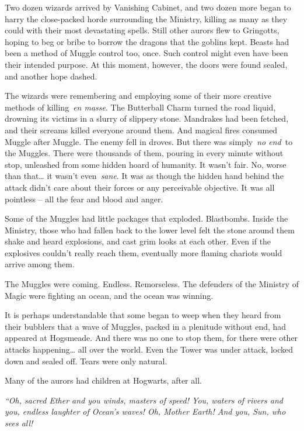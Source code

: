 Two dozen wizards arrived by Vanishing Cabinet, and two dozen more began
to harry the close-packed horde surrounding the Ministry, killing as
many as they could with their most devastating spells. Still other
aurors flew to Gringotts, hoping to beg or bribe to borrow the dragons
that the goblins kept. Beasts had been a method of Muggle control too,
once. Such control might even have been their intended purpose. At this
moment, however, the doors were found sealed, and another hope dashed.

The wizards were remembering and employing some of their more creative
methods of killing~\emph{en masse}. The Butterball Charm turned the road
liquid, drowning its victims in a slurry of slippery stone. Mandrakes
had been fetched, and their screams killed everyone around them. And
magical fires consumed Muggle after Muggle. The enemy fell in droves.
But there was simply~\emph{no end}~to the Muggles. There were thousands
of them, pouring in every minute without stop, unleashed from some
hidden hoard of humanity. It wasn't fair. No, worse than that\ldots{} it
wasn't even~\emph{sane}. It was as though the hidden hand behind the
attack didn't care about their forces or any perceivable objective. It
was all pointless -- all the fear and blood and anger.

Some of the Muggles had little packages that exploded. Blastbombs.
Inside the Ministry, those who had fallen back to the lower level felt
the stone around them shake and heard explosions, and cast grim looks at
each other. Even if the explosives couldn't really reach them,
eventually more flaming chariots would arrive among them.

The Muggles were coming. Endless. Remorseless. The defenders of the
Ministry of Magic were fighting an ocean, and the ocean was winning.

It is perhaps understandable that some began to weep when they heard
from their bubblers that a wave of Muggles, packed in a plenitude
without end, had appeared at Hogsmeade. And there was no one to stop
them, for there were other attacks happening\ldots{} all over the world.
Even the Tower was under attack, locked down and sealed off. Tears were
only natural.

Many of the aurors had children at Hogwarts, after all.

\mybreak

\emph{``Oh, sacred Ether and you winds, masters of speed! You, waters of
rivers and you, endless laughter of Ocean's waves! Oh, Mother Earth! And
you, Sun, who sees all!}

